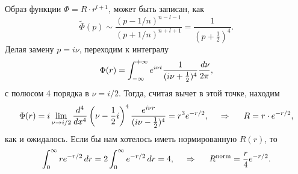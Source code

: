 Образ функции $\Phi = R \cdot r^{l+1}$, может быть записан, как
\begin{equation*}
    \tilde{\Phi} (p) \sim \frac{(p-1/n)^{n-l-1}}{(p+1/n)^{n+l+1}} = \frac{1}{(p+\frac{1}{2})^4}.
\end{equation*}
Делая замену $p = i \nu$, переходим к интегралу
\begin{equation*}
    \Phi(r) = \int_{-\infty}^{+\infty} 
    e^{i \nu t} \frac{1}{(i \nu + \tfrac{1}{2})^4}
    \frac{\, d \nu}{2\pi},
\end{equation*}
с полюсом 4 порядка в $\nu = i/2$. Тогда, считая вычет в этой точке, находим
\begin{equation*}
    \Phi(r) = i \lim_{\nu \to i/2} \frac{d^4}{d x^4}  \left(
        \nu - \frac{1}{2}i
    \right)^4 \frac{e^{i \nu r}}{(i \nu - \tfrac{1}{2})^4} = r^3 e^{-r/2},
    \hspace{0.5cm} \Rightarrow \hspace{0.5cm}
    R = r \cdot e^{-r/2},
\end{equation*}
как и ожидалось. Если бы нам хотелось иметь нормированную $R(r)$, то
\begin{equation*}
    \int_{0}^{\infty} r e^{-r/2} \, d r = 2 \int_{0}^{\infty} e^{-r/2} \, d r = 4,
    \hspace{0.5cm} \Rightarrow \hspace{0.5cm}
    R^{\text{norm}} = \frac{r}{4} e^{-r/2}.
\end{equation*}






